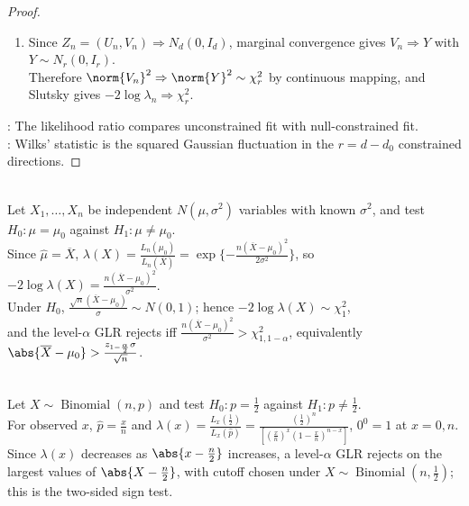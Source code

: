\begin{theorem}
\begin{proof}
\begin{enumerate}[label=(\roman*)]
\item Since $Z_n=(U_n,V_n)\Rightarrow N_d(0,I_d)$, marginal convergence gives $V_n\Rightarrow Y$ with $Y\sim N_r(0,I_r)$.\\
Therefore $\norm{V_n}^2\Rightarrow\norm{Y}^2\sim\chi_r^2$ by continuous mapping, and Slutsky gives $-2\log\lambda_n\Rightarrow\chi_r^2$.
\end{enumerate}
: The likelihood ratio compares unconstrained fit with null-constrained fit.\\
: Wilks' statistic is the squared Gaussian fluctuation in the $r=d-d_0$ constrained directions.
\end{proof}
\end{theorem}

\begin{example} \label{ex:normal-mean-glrt-known-variance} \\
Let $X_1,\ldots,X_n$ be independent $N(\mu,\sigma^2)$ variables with known $\sigma^2$, and test $H_0:\mu=\mu_0$ against $H_1:\mu\neq\mu_0$.\\
Since $\widehat{\mu}=\overline{X}$, $\lambda(X)=\frac{L_n(\mu_0)}{L_n(\overline{X})}=\exp\{-\frac{n(\overline{X}-\mu_0)^2}{2\sigma^2}\}$, so $-2\log\lambda(X)=\frac{n(\overline{X}-\mu_0)^2}{\sigma^2}$.\\
Under $H_0$, $\frac{\sqrt n(\overline{X}-\mu_0)}{\sigma}\sim N(0,1)$; hence $-2\log\lambda(X)\sim\chi_1^2$,\\
and the level-$\alpha$ GLR rejects iff $\frac{n(\overline{X}-\mu_0)^2}{\sigma^2}>\chi^2_{1,1-\alpha}$, equivalently $\abs{\overline{X}-\mu_0}>\frac{z_{1-\frac{\alpha}{2}}\sigma}{\sqrt n}$.
\end{example}

\begin{example} \label{ex:sign-test-binomial-glrt} \\
Let $X\sim\operatorname{Binomial}(n,p)$ and test $H_0:p=\frac{1}{2}$ against $H_1:p\neq\frac{1}{2}$.\\
For observed $x$, $\widehat p=\frac{x}{n}$ and $\lambda(x)=\frac{L_x(\frac{1}{2})}{L_x(\widehat p)}=\frac{(\frac{1}{2})^n}{[(\frac{x}{n})^x(1-\frac{x}{n})^{n-x}]}$, $0^0=1$ at $x=0,n$.\\
Since $\lambda(x)$ decreases as $\abs{x-\frac{n}{2}}$ increases, a level-$\alpha$ GLR rejects on the largest values of $\abs{X-\frac{n}{2}}$, with cutoff chosen under $X\sim\operatorname{Binomial}(n,\frac{1}{2})$; this is the two-sided sign test.
\end{example}

